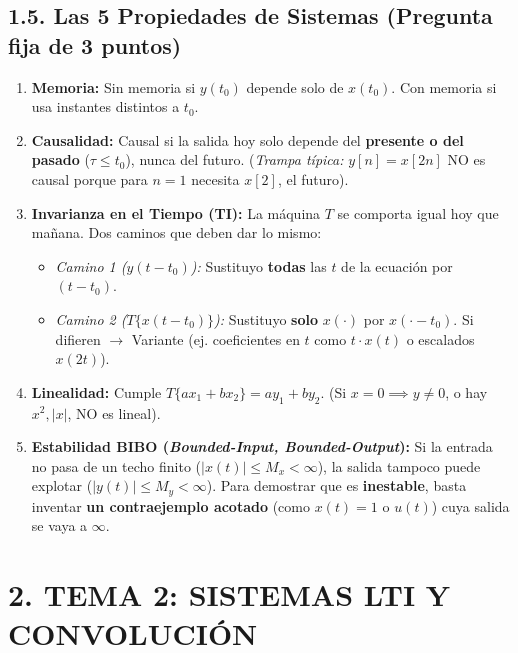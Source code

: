 \documentclass[10pt,a4paper]{article}
\begin{document}
	\subsection*{1.5. Las 5 Propiedades de Sistemas (Pregunta fija de 3 puntos)}
	\begin{enumerate}
		\item \textbf{Memoria:} Sin memoria si $y(t_0)$ depende solo de $x(t_0)$. Con memoria si usa instantes distintos a $t_0$.
		\item \textbf{Causalidad:} Causal si la salida hoy solo depende del \textbf{presente o del pasado} ($\tau \le t_0$), nunca del futuro. (\emph{Trampa típica:} $y[n]=x[2n]$ NO es causal porque para $n=1$ necesita $x[2]$, el futuro).
		\item \textbf{Invarianza en el Tiempo (TI):} La máquina $T$ se comporta igual hoy que mañana. Dos caminos que deben dar lo mismo:
		\begin{itemize}
			\item \emph{Camino 1 ($y(t-t_0)$):} Sustituyo \textbf{todas} las $t$ de la ecuación por $(t-t_0)$.
			\item \emph{Camino 2 ($T\{x(t-t_0)\}$):} Sustituyo \textbf{solo} $x(\cdot)$ por $x(\cdot - t_0)$. Si difieren $\to$ Variante (ej. coeficientes en $t$ como $t\cdot x(t)$ o escalados $x(2t)$).
		\end{itemize}
		\item \textbf{Linealidad:} Cumple $T\{ax_1 + bx_2\} = ay_1 + by_2$. (Si $x=0 \implies y \neq 0$, o hay $x^2, |x|$, NO es lineal).
		\item \textbf{Estabilidad BIBO (\emph{Bounded-Input, Bounded-Output}):} Si la entrada no pasa de un techo finito ($|x(t)| \le M_x < \infty$), la salida tampoco puede explotar ($|y(t)| \le M_y < \infty$). Para demostrar que es \textbf{inestable}, basta inventar \textbf{un contraejemplo acotado} (como $x(t)=1$ o $u(t)$) cuya salida se vaya a $\infty$.
	\end{enumerate}
	\pagebreak
	\section*{2. TEMA 2: SISTEMAS LTI Y CONVOLUCIÓN}
	
\end{document}
